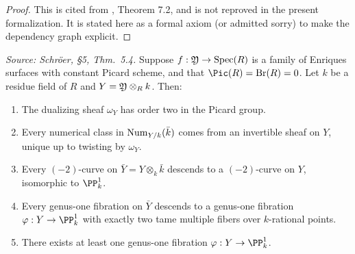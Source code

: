 \begin{proof}
  This is cited from \cite{Schroeer 2021b}, Theorem 7.2, and is not reproved in the present formalization.
  It is stated here as a formal axiom (or admitted sorry) to make the dependency graph explicit.
\end{proof}

\begin{theorem}
  \label{thm:family-with-constant-pic}
  \textit{Source: Schr\"oer, §5, Thm.~5.4.}
  Suppose \(f : \mathfrak{Y} \to \mathrm{Spec}(R)\) is a family of Enriques surfaces with constant Picard scheme,
  and that \(\Pic(R) = \Br(R) = 0\).
  Let \(k\) be a residue field of \(R\) and \(Y = \mathfrak{Y} \otimes_R k\).
  Then:
  \begin{enumerate}
  \item The dualizing sheaf \(\omega_Y\) has order two in the Picard group.
  \item Every numerical class in \(\mathrm{Num}_{Y/k}(\bar{k})\) comes from an invertible sheaf on \(Y\),
        unique up to twisting by \(\omega_Y\).
  \item Every \((-2)\)-curve on \(\bar{Y} = Y \otimes_k \bar{k}\) descends to a \((-2)\)-curve on \(Y\),
        isomorphic to \(\PP^1_k\).
  \item Every genus-one fibration on \(\bar{Y}\) descends to a genus-one fibration \(\varphi : Y \to \PP^1_k\)
        with exactly two tame multiple fibers over \(k\)-rational points.
  \item There exists at least one genus-one fibration \(\varphi : Y \to \PP^1_k\).
  \end{enumerate}
\end{theorem}

